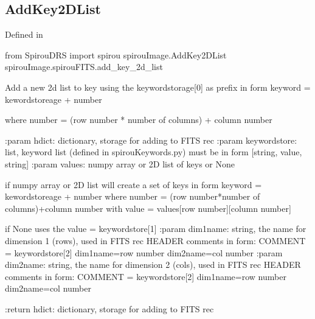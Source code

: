\begin{minipage}{\textwidth}
\subsection{AddKey2DList}

Defined in \spirouImage{}

\begin{pythonbox}
from SpirouDRS import spirou
spirouImage.AddKey2DList
spirouImage.spirouFITS.add_key_2d_list
\end{pythonbox}

\begin{pythondocstring}
Add a new 2d list to key using the keywordstorage[0] as prefix in form
keyword = kewordstoreage + number

where number = (row number * number of columns) + column number

:param hdict: dictionary, storage for adding to FITS rec
:param keywordstore: list, keyword list (defined in spirouKeywords.py)
                     must be in form [string, value, string]
:param values: numpy array or 2D list of keys or None

              if numpy array or 2D list will create a set of keys in form
              keyword = kewordstoreage + number
              where number = (row number*number of columns)+column number
              with value = values[row number][column number]

              if None uses the value = keywordstore[1]
:param dim1name: string, the name for dimension 1 (rows), used in FITS rec
                 HEADER comments in form:
      COMMENT = keywordstore[2] dim1name={row number} dim2name={col number}
:param dim2name: string, the name for dimension 2 (cols), used in FITS rec
                 HEADER comments in form:
      COMMENT = keywordstore[2] dim1name={row number} dim2name={col number}

:return hdict: dictionary, storage for adding to FITS rec
\end{pythondocstring}
\end{minipage}


